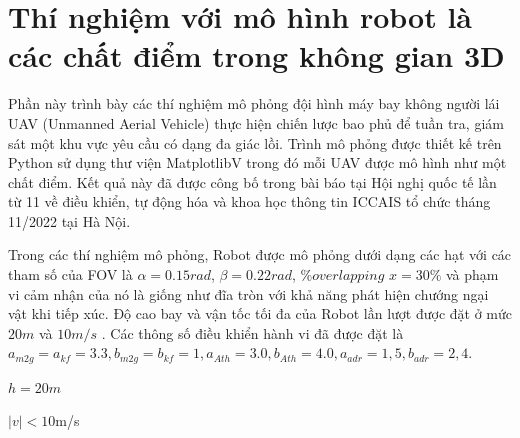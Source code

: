 \section{Thí nghiệm với mô hình robot là các chất điểm trong không gian 3D}
\label{sec:result}
Phần này trình bày các thí nghiệm mô phỏng đội hình máy bay không người lái UAV (Unmanned Aerial Vehicle) thực hiện chiến lược bao phủ để tuần tra, giám sát một khu vực yêu cầu có dạng đa giác lồi. Trình mô phỏng được thiết kế trên Python sử dụng thư viện MatplotlibV trong đó mỗi UAV được mô hình như một chất điểm. Kết quả này đã được công bố trong bài báo tại Hội nghị quốc tế lần từ 11 về điều khiển, tự động hóa và khoa học thông tin ICCAIS tổ chức tháng 11/2022 tại Hà Nội.

Trong các thí nghiệm mô phỏng, Robot được mô phỏng dưới dạng các hạt với các tham số của FOV là $\alpha = 0.15rad$, $\beta = 0.22 rad$, $\%overlapping$ $x = 30\%$ và phạm vi cảm nhận của nó là giống như đĩa tròn với khả năng phát hiện chướng ngại vật khi tiếp xúc. Độ cao bay và vận tốc tối đa của Robot lần lượt được đặt ở mức $20m$ và $10m/s$ . Các thông số điều khiển hành vi đã được đặt là $a_{m2g} = a_{kf} = 3.3, b_{m2g} = b_ {kf} = 1, a_ {Ath} = 3.0, b_ {Ath} = 4.0, a_ {adr} = 1,5, b_ {adr} = 2,4$. 

$h = 20m$

$|v|<10$m/s

